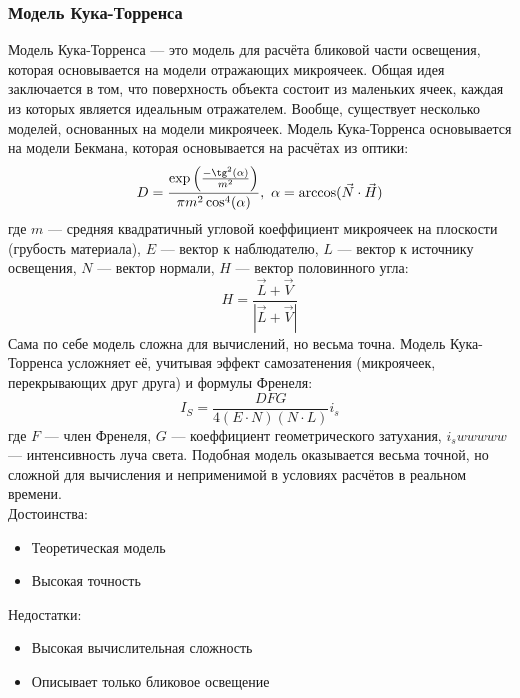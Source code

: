 \documentclass[a4paper,12pt]{report}
\numberwithin{equation}{section}
\begin{document}
\subsubsection*{Модель Кука-Торренса}
Модель Кука-Торренса \cite{cooktorrancemodel} --- это модель для расчёта бликовой части освещения, которая основывается на модели отражающих микроячеек. Общая идея заключается в том, что поверхность объекта состоит из маленьких ячеек, каждая из которых является идеальным отражателем. Вообще, существует несколько моделей, основанных на модели микроячеек. Модель Кука-Торренса основывается на модели Бекмана, которая основывается на расчётах из оптики:
\begin{equation}
D = \frac{\exp \left( \frac{-\tg^2(\alpha)}{m^2} \right)}{\pi m^2 \cos^4(\alpha)}, ~ \alpha = \arccos(\vec{N} \cdot \vec{H})
\end{equation}
где $m$ --- средняя квадратичный угловой коеффициент микроячеек на плоскости (грубость материала), $E$ --- вектор к наблюдателю, $L$ --- вектор к источнику освещения, $N$ --- вектор нормали, $H$ --- вектор половинного угла:
\begin{equation}
H = \frac{\vec{L} + \vec{V}}{|\vec{L} + \vec{V}|} \label{halfway_vec}
\end{equation}
Сама по себе модель сложна для вычислений, но весьма точна. Модель Кука-Торренса усложняет её, учитывая эффект самозатенения (микроячеек, перекрывающих друг друга) и формулы Френеля:
\begin{equation}
I_S = \frac{D F G}{4(E \cdot N)(N\cdot L)} i_s
\end{equation}
где $F$ --- член Френеля, $G$ --- коеффициент геометрического затухания, $i_swwwww$ --- интенсивность луча света. Подобная модель оказывается весьма точной, но сложной для вычисления и неприменимой в условиях расчётов в реальном времени. \\
Достоинства:
\begin{itemize}
\item Теоретическая модель
\item Высокая точность
\end{itemize}
Недостатки:
\begin{itemize}
\item Высокая вычислительная сложность
\item Описывает только бликовое освещение
\end{itemize}
\end{document}
